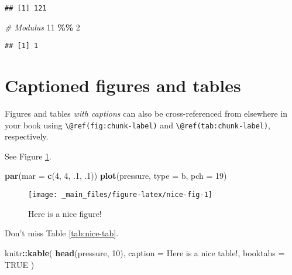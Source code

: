 \documentclass[
]{book}
\newenvironment{Shaded}{\begin{snugshade}}{\end{snugshade}}
\newcommand{\AttributeTok}[1]{\textcolor[rgb]{0.13,0.29,0.53}{#1}}
\newcommand{\CommentTok}[1]{\textcolor[rgb]{0.56,0.35,0.01}{\textit{#1}}}
\newcommand{\ConstantTok}[1]{\textcolor[rgb]{0.56,0.35,0.01}{#1}}
\newcommand{\DecValTok}[1]{\textcolor[rgb]{0.00,0.00,0.81}{#1}}
\newcommand{\FunctionTok}[1]{\textcolor[rgb]{0.13,0.29,0.53}{\textbf{#1}}}
\newcommand{\NormalTok}[1]{#1}
\newcommand{\SpecialCharTok}[1]{\textcolor[rgb]{0.81,0.36,0.00}{\textbf{#1}}}
\newcommand{\StringTok}[1]{\textcolor[rgb]{0.31,0.60,0.02}{#1}}
\theoremstyle{definition}
\theoremstyle{definition}
\theoremstyle{definition}
\theoremstyle{definition}
\theoremstyle{remark}
\begin{document}
\begin{verbatim}
## [1] 121
\end{verbatim}

\begin{Shaded}
\begin{Highlighting}[]
\CommentTok{\# Modulus}
\DecValTok{11} \SpecialCharTok{\%\%} \DecValTok{2}
\end{Highlighting}
\end{Shaded}

\begin{verbatim}
## [1] 1
\end{verbatim}

\hypertarget{captioned-figures-and-tables}{%
\section{Captioned figures and tables}\label{captioned-figures-and-tables}}

Figures and tables \emph{with captions} can also be cross-referenced from elsewhere in your book using \texttt{\textbackslash{}@ref(fig:chunk-label)} and \texttt{\textbackslash{}@ref(tab:chunk-label)}, respectively.

See Figure \ref{fig:nice-fig}.

\begin{Shaded}
\begin{Highlighting}[]
\FunctionTok{par}\NormalTok{(}\AttributeTok{mar =} \FunctionTok{c}\NormalTok{(}\DecValTok{4}\NormalTok{, }\DecValTok{4}\NormalTok{, .}\DecValTok{1}\NormalTok{, .}\DecValTok{1}\NormalTok{))}
\FunctionTok{plot}\NormalTok{(pressure, }\AttributeTok{type =} \StringTok{\textquotesingle{}b\textquotesingle{}}\NormalTok{, }\AttributeTok{pch =} \DecValTok{19}\NormalTok{)}
\end{Highlighting}
\end{Shaded}

\begin{figure}

{\centering \texttt{[image: \_main\_files/figure-latex/nice-fig-1]} 

}

\caption{Here is a nice figure!}\label{fig:nice-fig}
\end{figure}

Don't miss Table \ref{tab:nice-tab}.

\begin{Shaded}
\begin{Highlighting}[]
\NormalTok{knitr}\SpecialCharTok{::}\FunctionTok{kable}\NormalTok{(}
  \FunctionTok{head}\NormalTok{(pressure, }\DecValTok{10}\NormalTok{), }\AttributeTok{caption =} \StringTok{\textquotesingle{}Here is a nice table!\textquotesingle{}}\NormalTok{,}
  \AttributeTok{booktabs =} \ConstantTok{TRUE}
\NormalTok{)}
\end{Highlighting}
\end{Shaded}
\end{document}
